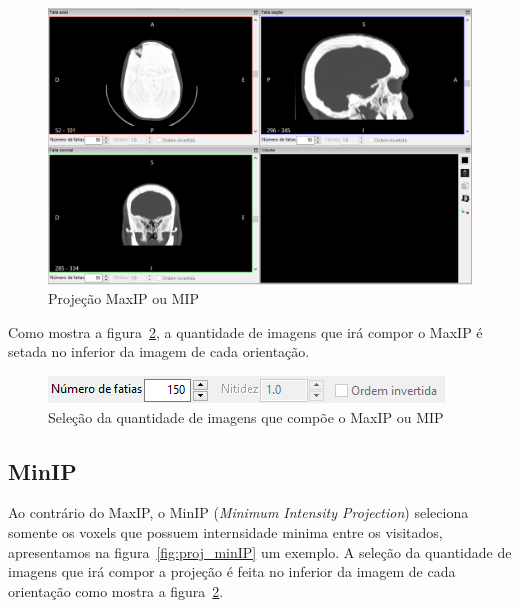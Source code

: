 \begin{figure}[H]
\centering
\includegraphics[scale=0.40]{../user_guide_figures/invesalius_screen/multiplanar_window_maxip_pt.png}
\caption{Projeção MaxIP ou MIP}
\label{fig:proj_maxip}
\end{figure}

Como mostra a figura~\ref{fig:proj_maxip_qtd}, a quantidade de imagens que irá compor o MaxIP é setada no inferior da imagem de cada orientação.

\begin{figure}[H]
\centering
\includegraphics[scale=0.80]{../user_guide_figures/invesalius_screen/multiplanar_window_maxip_number_pt.png}
\caption{Seleção da quantidade de imagens que compõe o MaxIP ou MIP}
\label{fig:proj_maxip_qtd}
\end{figure}

\subsection{MinIP}

Ao contrário do MaxIP, o MinIP (\textit{Minimum Intensity Projection}) seleciona somente os voxels que possuem internsidade minima entre os visitados, apresentamos na figura~\ref{fig:proj_minIP} um exemplo. A seleção da quantidade de imagens que irá compor a projeção é feita no inferior da imagem de cada orientação como mostra a figura~\ref{fig:proj_maxip_qtd}.

